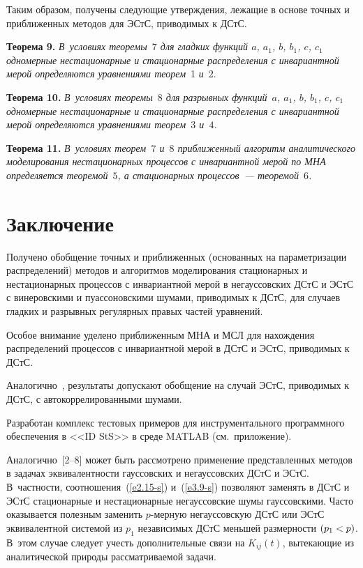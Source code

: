 \begin{multicols}{2}
\smallskip

Таким образом, получены следующие утверждения, лежащие в основе точных и
приближенных методов для ЭСтС, приводимых к ДСтС.

\smallskip

\noindent
\textbf{Теорема 9.} \textit{В~условиях теоремы~$7$ для гладких функций
$a$, $a_1$, $b$, $b_1$, $c$, $c_1$ одномерные нестационарные и стационарные
распределения с инвариантной мерой определяются уравнениями теорем}~1 \textit{и}~2.

\smallskip

\noindent
\textbf{Теорема 10.} \textit{В~условиях теоремы~$8$ для разрывных функций~$a$,
$a_1$, $b$, $b_1$, $c$, $c_1$ одномерные нестационарные и стационарные
распределения с инвариантной мерой определяются уравнениями теорем~$3$ и~$4$.}

\smallskip

\noindent
\textbf{Теорема 11.} \textit{В~условиях теорем~$7$ и~$8$
приближенный алгоритм аналитического моделирования нестационарных
процессов с инвариантной мерой по МНА определяется теоремой~$5$,
а стационарных процессов~--- теоремой~$6$.}

\vspace*{-12pt}

\section{Заключение}

Получено обобщение точных и приближенных (основанных на
параметризации распределений) методов и алгоритмов моделирования
стационарных и нестационарных процессов с инвариантной мерой в
негауссовских ДСтС и ЭСтС с винеровскими и пуассоновскими шумами,
приводимых к ДСтС, для случаев гладких и разрывных регулярных правых
частей уравнений.

Особое внимание уделено приближенным
МНА и МСЛ для нахождения
распределений процессов с инвариантной мерой в ДСтС и ЭСтС,
приводимых к ДСтС.

Аналогично~\cite{2-s, 15-s, 25-s}, результаты допускают обобщение на случай
ЭСтС, приводимых к ДСтС, с автокоррелированными шумами.

Разработан комплекс тестовых примеров для инструментального
программного обеспечения в   <<ID StS>> в среде  MATLAB (см.\
приложение).

Аналогично~[2--8] может быть рас\-смот\-ре\-но применение представленных
методов в задачах эквивалентности гауссовских и негауссовских ДСтС и
ЭСтС. В~частности, соотношения~(\ref{e2.15-s}) и~(\ref{e3.9-s})
позволяют заменять в
ДСтС и ЭСтС стационарные и нестационарные негауссовские шумы
гауссовскими. Часто оказывается полезным заменить  $p$-мер\-ную
негауссовскую ДСтС или ЭСтС эквивалентной системой из  $p_1$
независимых ДСтС меньшей размерности  $(p_1\hm<p)$. В~этом случае
следует учесть дополнительные связи на  $K_{ij}(t)$, вытекающие из
аналитической природы рассматриваемой задачи.


\end{multicols}
